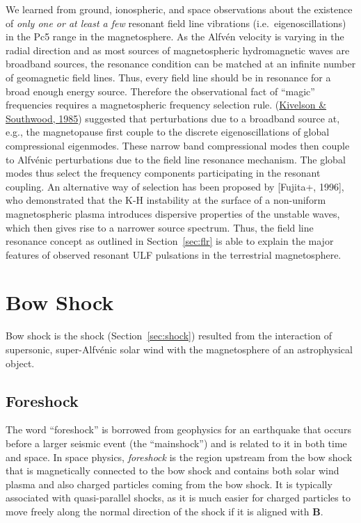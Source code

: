 \documentclass[
  notoc %
]{tufte-book}
\begin{document}
We learned from ground, ionospheric, and space observations about the
existence of \emph{only one or at least a few} resonant field line
vibrations (i.e.~eigenoscillations) in the Pc5 range in the
magnetosphere. As the Alfvén velocity is varying in the radial direction
and as most sources of magnetospheric hydromagnetic waves are broadband
sources, the resonance condition can be matched at an infinite number of
geomagnetic field lines. Thus, every field line should be in resonance
for a broad enough energy source. Therefore the observational fact of
``magic'' frequencies requires a magnetospheric frequency selection
rule. (\protect\hyperlink{ref-kivelson1985resonant}{Kivelson \&
Southwood, 1985}) suggested that perturbations due to a broadband source
at, e.g., the magnetopause first couple to the discrete
eigenoscillations of global compressional eigenmodes. These narrow band
compressional modes then couple to Alfvénic perturbations due to the
field line resonance mechanism. The global modes thus select the
frequency components participating in the resonant coupling. An
alternative way of selection has been proposed by {[}Fujita+, 1996{]},
who demonstrated that the K-H instability at the surface of a
non-uniform magnetospheric plasma introduces dispersive properties of
the unstable waves, which then gives rise to a narrower source spectrum.
Thus, the field line resonance concept as outlined in
Section~\ref{sec:flr} is able to explain the major features of observed
resonant ULF pulsations in the terrestrial magnetosphere.

\hypertarget{bow-shock}{%
\section{Bow Shock}\label{bow-shock}}

Bow shock is the shock (Section~\ref{sec:shock}) resulted from the
interaction of supersonic, super-Alfvénic solar wind with the
magnetosphere of an astrophysical object.

\hypertarget{foreshock}{%
\subsection{Foreshock}\label{foreshock}}

The word ``foreshock'' is borrowed from geophysics for an earthquake
that occurs before a larger seismic event (the ``mainshock'') and is
related to it in both time and space. In space physics, \emph{foreshock}
is the region upstream from the bow shock that is magnetically connected
to the bow shock and contains both solar wind plasma and also charged
particles coming from the bow shock. It is typically associated with
quasi-parallel shocks, as it is much easier for charged particles to
move freely along the normal direction of the shock if it is aligned
with \(\mathbf{B}\).
\end{document}
